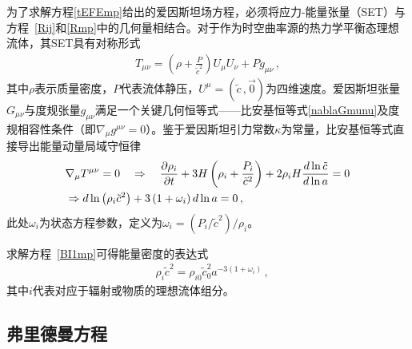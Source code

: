 \documentclass[jkps,preprint,fleqn]{revtex4}
\newcommand{\tc}{\tilde{c}}
\begin{document}
为了求解方程\eqref{tEFEmp}给出的爱因斯坦场方程，必须将应力-能量张量（SET）与方程~\eqref{Rij}和\eqref{Rmp}中的几何量相结合。对于作为时空曲率源的热力学平衡态理想流体，其SET具有对称形式
\begin{align} T_{\mu\nu} = \left( \rho + \frac{P}{\tc^2} \right) U_{\mu} U_{\nu} + P g_{\mu\nu} \label{Tmunump} \,, \end{align}
其中$\rho$表示质量密度，$P$代表流体静压，$U^{\mu} = (\tc\,,\vec{0})$为四维速度。爱因斯坦张量$G_{\mu\nu}$与度规张量$g_{\mu\nu}$满足一个关键几何恒等式——比安基恒等式\eqref{nablaGmunu}及度规相容性条件（即$\nabla_{\mu} g^{\mu\nu} = 0$）。鉴于爱因斯坦引力常数$\kappa$为常量，比安基恒等式直接导出能量动量局域守恒律
\begin{align} &\nabla_{\mu} \tensor{T}{^\mu^\nu} = 0 \quad \Rightarrow \quad \frac{\partial \rho_i}{\partial t} + 3 H \left( \rho_i + \frac{P_i}{\tc^2} \right) + 2 \rho_i H \frac{d \ln \tc}{d \ln a} = 0 \nonumber \\ &\Rightarrow d \ln \left( \rho_i \tc^2 \right) + 3 \left( 1 + \omega_i \right) d \ln a = 0 \label{BI1mp} \,, \end{align}
此处$\omega_i$为状态方程参数，定义为$\omega_i = (P_i/\tc^2)/\rho_i$。

求解方程~\eqref{BI1mp}可得能量密度的表达式
\begin{align} &\rho_i \tc^{2} = \rho_{i0} \tc_0^2 a^{-3 (1 + \omega_i)} \label{rhomp} \,,\end{align}
其中$i$代表对应于辐射或物质的理想流体组分。
\subsection{弗里德曼方程}\label{subsec:FE}
\end{document}
